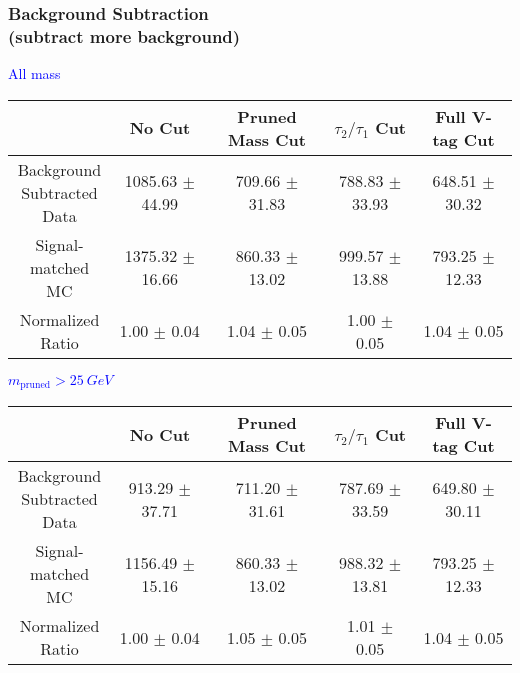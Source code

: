 \documentclass{beamer}
\begin{document}
\begin{frame}
  \frametitle{Background Subtraction \\ (subtract more background)}
  \begin{adjustwidth}{-1.5em}{-1.5em}
    \centering
    \vspace{6pt}
    \textcolor{blue}{All mass}
    \vspace{6pt}

    {\scriptsize
      \begin{tabular}{c | c | c | c | c}
        \hline
        & No Cut & Pruned Mass Cut & $\tau_2/\tau_1$ Cut & Full V-tag Cut \\
        \hline
        \makecell{Background \\ Subtracted \\ Data} & 1085.63 $\pm$ 44.99 & 709.66 $\pm$ 31.83 & 788.83 $\pm$ 33.93 & 648.51 $\pm$ 30.32 \\
        \makecell{Signal-\\ matched MC} & 1375.32 $\pm$ 16.66 & 860.33 $\pm$ 13.02 & 999.57 $\pm$ 13.88 & 793.25 $\pm$ 12.33 \\
        \hline
        \makecell{Normalized \\ Ratio} & 1.00 $\pm$ 0.04 & 1.04 $\pm$ 0.05 & 1.00 $\pm$ 0.05 & 1.04 $\pm$ 0.05 \\
        \hline
      \end{tabular}
    }

    \vspace{6pt}
    \textcolor{blue}{$m_\text{pruned} > \SI{25}{GeV}$}
    \vspace{6pt}

    {\scriptsize
      \begin{tabular}{c | c | c | c | c}
        \hline
        & No Cut & Pruned Mass Cut & $\tau_2/\tau_1$ Cut & Full V-tag Cut \\
        \hline
        \makecell{Background \\ Subtracted \\ Data} & 913.29 $\pm$ 37.71 & 711.20 $\pm$ 31.61 & 787.69 $\pm$ 33.59 & 649.80 $\pm$ 30.11 \\
        \makecell{Signal-\\ matched MC} & 1156.49 $\pm$ 15.16 & 860.33 $\pm$ 13.02 & 988.32 $\pm$ 13.81 & 793.25 $\pm$ 12.33 \\
        \hline
        \makecell{Normalized \\ Ratio} & 1.00 $\pm$ 0.04 & 1.05 $\pm$ 0.05 & 1.01 $\pm$ 0.05 & 1.04 $\pm$ 0.05 \\
        \hline
      \end{tabular}
    }
  \end{adjustwidth}
\end{frame}
\end{document}
